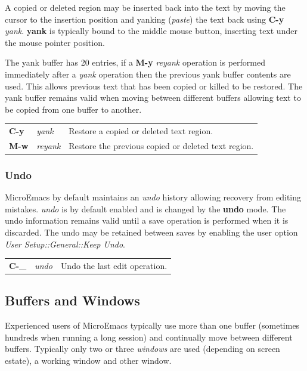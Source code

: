 \documentclass[11pt,a4paper,pdftex]{article}
\begin{document}
  A copied or deleted region may be inserted back into the text by moving the
  cursor to the insertion position and yanking (\textit{paste}) the text back
  using \textbf{C-y} \textit{yank}. \textbf{yank} is typically bound to the
  middle mouse button, inserting text under the mouse pointer position.

  The yank buffer has 20 entries, if a \textbf{M-y} \textit{reyank} operation
  is performed immediately after a \textit{yank} operation then the previous
  yank buffer contents are used. This allows previous text that has been
  copied or killed to be restored. The yank buffer remains valid when moving
  between different buffers allowing text to be copied from one buffer to
  another.

  \begin{longtable}{ll@{\ --\ }l}
    \endhead
    \endfoot
    \endlastfoot
    \textbf{C-y} & \textit{yank} &
    Restore a copied or deleted text region.\\
    \textbf{M-w} & \textit{reyank} &
    Restore the previous copied or deleted text region.\\
  \end{longtable}

\subsubsection{Undo}

  MicroEmacs by default maintains an \textit{undo} history allowing recovery
  from editing mistakes. \textit{undo} is by default enabled and is changed by
  the \textbf{undo} mode. The undo information remains valid until a save
  operation is performed when it is discarded. The undo may be retained
  between saves by enabling the user option \textit{User
  Setup::\-General::\-Keep Undo}.

  \begin{longtable}{ll@{\ --\ }l}
    \endhead
    \endfoot
    \endlastfoot
    \textbf{C-\_} & \textit{undo} &
    Undo the last edit operation.\\
  \end{longtable}

\subsection{Buffers and Windows}

  Experienced users of MicroEmacs typically use more than one buffer
  (sometimes hundreds when running a long session) and continually move
  between different buffers. Typically only two or three \textit{windows} are
  used (depending on screen estate), a working window and other window.
\end{document}
